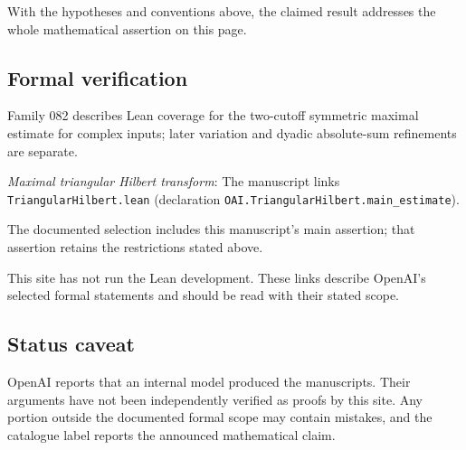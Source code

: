 \documentclass[11pt]{article}
\begin{document}
With the hypotheses and conventions above, the claimed result addresses the whole mathematical assertion on this page.

\subsection{Formal verification}
Family 082 describes Lean coverage for the two-cutoff symmetric maximal estimate for complex inputs; later variation and dyadic absolute-sum refinements are separate.

\textit{Maximal triangular Hilbert transform}: The manuscript links \texttt{TriangularHilbert.lean} (declaration \texttt{OAI.TriangularHilbert.main\_estimate}).

The documented selection includes this manuscript’s main assertion; that assertion retains the restrictions stated above.

This site has not run the Lean development. These links describe OpenAI’s selected formal statements and should be read with their stated scope.

\subsection{Status caveat}
OpenAI reports that an internal model produced the manuscripts. Their arguments have not been independently verified as proofs by this site. Any portion outside the documented formal scope may contain mistakes, and the catalogue label reports the announced mathematical claim.
\end{document}
